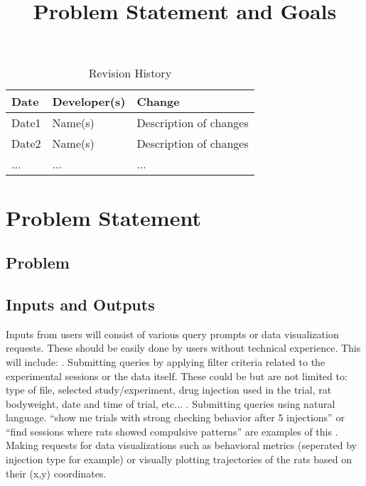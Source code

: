 \documentclass{article}
\title{Problem Statement and Goals\\\progname}
\author{\authname}
\date{}
\begin{document}
\maketitle

\begin{table}[hp]
\caption{Revision History} \label{TblRevisionHistory}
\begin{tabularx}{\textwidth}{llX}
\toprule
\textbf{Date} & \textbf{Developer(s)} & \textbf{Change}\\
\midrule
Date1 & Name(s) & Description of changes\\
Date2 & Name(s) & Description of changes\\
... & ... & ...\\
\bottomrule
\end{tabularx}
\end{table}

\section{Problem Statement}



\subsection{Problem}

\subsection{Inputs and Outputs}


\par{Inputs from users will consist of various query prompts or data visualization requests. These should be easily done
by users without technical experience. This will include: \newline \newline {}. Submitting queries by applying filter criteria related to the experimental sessions or the data itself.
These could be but are not limited to: type of file, selected study/experiment, drug injection used in the trial,
rat bodyweight, date and time of trial, etc... \newline \newline {}. Submitting queries using natural language. “show me trials with strong checking behavior after 5 injections”
or “find sessions where rats showed compulsive patterns” are examples of this \newline \newline {}. Making requests for data visualizations such as behavioral metrics (seperated by injection type for example) or visually plotting trajectories of the rats
based on their (x,y) coordinates.}
\newline
\end{document}
